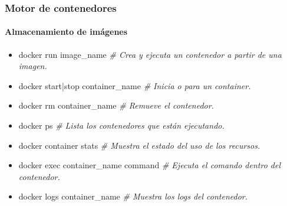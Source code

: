 \begin{frame}
    \frametitle{Motor de contenedores}
    \framesubtitle{Almacenamiento de imágenes}

    \begin{block}{}
        \begin{itemize}
            \item docker run \<image\_name\> \textit{\# Crea y ejecuta un contenedor a partir de una imagen.}
            \item docker start|stop \<container\_name\> \textit{\# Inicia o para un container.}
            \item docker rm \<container\_name\> \textit{\# Remueve el contenedor.}
            \item docker ps \textit{\# Lista los contenedores que están ejecutando.}
            \item docker container stats \textit{\# Muestra el estado del uso de los recursos.}
            \item docker exec \<container\_name\> \<command\> \textit{\# Ejecuta el comando dentro del contenedor.}
            \item docker logs \<container\_name\> \textit{\# Muestra los logs del contenedor.}
        \end{itemize}
    \end{block}
        
\end{frame}


